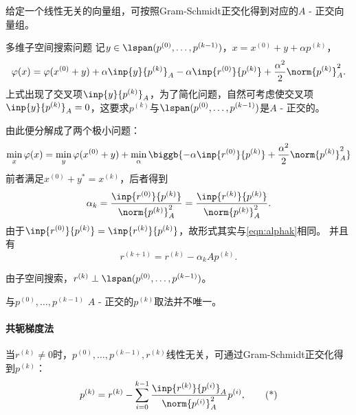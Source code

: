 \begin{corollary}
    给定一个线性无关的向量组，可按照Gram-Schmidt正交化得到对应的$A$ - 正交向量组。
\end{corollary}

\begin{theorem}
    {多维子空间搜索问题}{}
    记$y\in\lspan(p^{(0)},\ldots,p^{(k-1)})$，$x=x^{(0)}+y+\alpha p^{(k)}$，
    \[
        \varphi(x)=\varphi(x^{(0)}+y)+\alpha\inp{y}{p^{(k)}}_A-\alpha\inp{r^{(0)}}{p^{(k)}}+\frac{\alpha^2}2\norm{p^{(k)}}^2_A.
    \]
    上式出现了交叉项$\inp{y}{p^{(k)}}_A$，为了简化问题，自然可考虑使交叉项$\inp{y}{p^{(k)}}_A=0$，这要求$p^{(k)}$与$\lspan(p^{(0)},\ldots,p^{(k-1)})$是$A$ - 正交的。%

    由此便分解成了两个极小问题：
    \[
        \min_x\varphi(x)=\min_y\varphi(x^{(0)}+y)+\min_\alpha\biggb{-\alpha\inp{r^{(0)}}{p^{(k)}}+\frac{\alpha^2}2\norm{p^{(k)}}^2_A}
    \]
    前者满足$x^{(0)}+y^*=x^{(k)}$，后者得到
    \begin{equation}
        \alpha_k=\frac{\inp{r^{(0)}}{p^{(k)}}}{\norm{p^{(k)}}_A^2}=\frac{\inp{r^{(k)}}{p^{(k)}}}{\norm{p^{(k)}}_A^2}.
    \end{equation}
    由于$\inp{r^{(0)}}{p^{(k)}}=\inp{r^{(k)}}{p^{(k)}}$，故形式其实与\eqref{eqn:alphak}相同。
    并且有
    \begin{equation}
        \label{eqn:r^k+1=r^k-alpha_kAp^k}
        r^{(k+1)}=r^{(k)}-\alpha_kAp^{(k)}.
    \end{equation}
\end{theorem}

\begin{corollary}
    由子空间搜索，$r^{(k)}\perp\lspan(p^{(0)},\ldots,p^{(k-1)})$。
\end{corollary}

\begin{remark}
    与$p^{(0)},\ldots,p^{(k-1)}$ $A$ - 正交的$p^{(k)}$取法并不唯一。
\end{remark}

\paragraph{共轭梯度法}

当$r^{(k)}\neq 0$时，$p^{(0)},\ldots,p^{(k-1)},r^{(k)}$线性无关，可通过Gram-Schmidt正交化得到$p^{(k)}$：
\begin{equation}
    \label{eqn:Gram-Schmidt p^k}
    p^{(k)}=r^{(k)}-\sum_{i=0}^{k-1}\frac{\inp{r^{(k)}}{p^{(i)}}_A}{\norm{p^{(i)}}_A^2}p^{(i)},
    \tag{*}
\end{equation}

